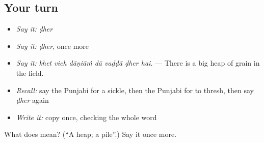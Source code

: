 \subsection*{Your turn}
\begin{itemize}
\raggedright
  \item \emph{Say it:} \emph{ḍher}
  \item \emph{Say it:} \emph{ḍher}, once more
  \item \emph{Say it:} \emph{khet vich dāṇiāṁ dā vaḍḍā ḍher hai.} — There is a big heap of grain in the field.
  \item \emph{Recall:} say the Punjabi for a sickle, then the Punjabi for to thresh, then say \emph{ḍher} again
  \item \emph{Write it:} copy \textbf{} once, checking the whole word
\end{itemize}

\begin{tcolorbox}[breakable,colback=teal!4,colframe=teal!35!black,title={Before you move on}]
What does  mean? (\textquotedblleft{}A heap; a pile\textquotedblright{}.) Say it once more.
\end{tcolorbox}
